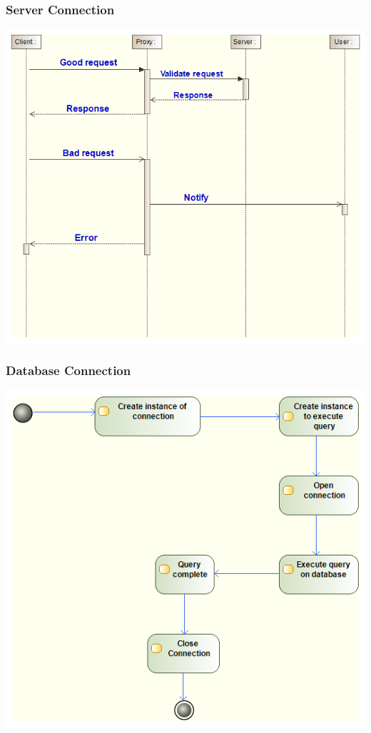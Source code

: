 \documentclass[11pt]{article}
\begin{document}
\subsubsection{Server Connection}
\begin{center} 
	\includegraphics[width=\textwidth]{../Images/Server_Connection_Sequence_Diagram.png}\\[0.5cm]
\end{center}

\newpage
\subsubsection{Database Connection}
\begin{center} 
	\includegraphics[width=\textwidth]{../Images/Database_Connection_Activity-Diagram.png}\\[0.5cm]
\end{center}
\end{document}
